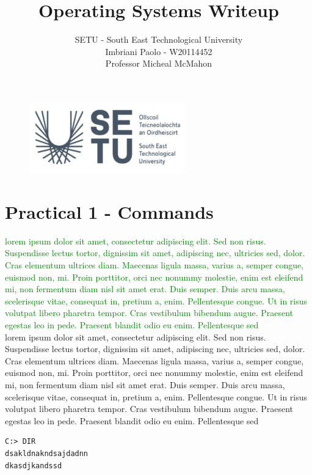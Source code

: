 \documentclass[a4paper]{article}
\title{Operating Systems Writeup}
\author{SETU - South East Technological University\\Imbriani Paolo - W20114452\\Professor Micheal McMahon}
\begin{document}
\begin{figure}
    \centering
    \includegraphics[width=0.6\textwidth]{SETU.png}
    \label{fig:centered-image}
\end{figure}

\maketitle 

\pagebreak

\tableofcontents

\pagebreak

\section{Practical 1 -  Commands}

\textcolor{green}{lorem ipsum dolor sit amet, consectetur adipiscing elit. Sed non risus. Suspendisse lectus tortor, dignissim sit amet, adipiscing nec, ultricies sed, dolor. Cras elementum ultrices diam. Maecenas ligula massa, varius a, semper congue, euismod non, mi. Proin porttitor, orci nec nonummy molestie, enim est eleifend mi, non fermentum diam nisl sit amet erat. Duis semper. Duis arcu massa, scelerisque vitae, consequat in, pretium a, enim. Pellentesque congue. Ut in risus volutpat libero pharetra tempor. Cras vestibulum bibendum augue. Praesent egestas leo in pede. Praesent blandit odio eu enim. Pellentesque sed}
\\
lorem ipsum dolor sit amet, consectetur adipiscing elit. Sed non risus. Suspendisse lectus tortor, dignissim sit amet, adipiscing nec, ultricies sed, dolor. Cras elementum ultrices diam. Maecenas ligula massa, varius a, semper congue, euismod non, mi. Proin porttitor, orci nec nonummy molestie, enim est eleifend mi, non fermentum diam nisl sit amet erat. Duis semper. Duis arcu massa, scelerisque vitae, consequat in, pretium a, enim. Pellentesque congue. Ut in risus volutpat libero pharetra tempor. Cras vestibulum bibendum augue. Praesent egestas leo in pede. Praesent blandit odio eu enim. Pellentesque sed

\begin{lstlisting}
C:> DIR
dsakldnakndsajdadnn
dkasdjkandssd

\end{lstlisting}
\end{document}

